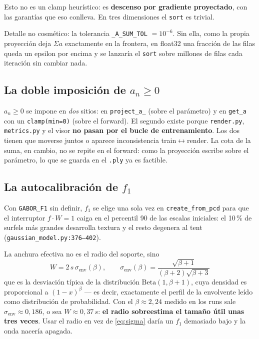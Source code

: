 \documentclass[12pt]{extarticle}
\newcommand{\ssum}{\Sigma a}
\newcommand{\code}[1]{\texttt{#1}}
\begin{document}
Esto no es un clamp heurístico: es \textbf{descenso por gradiente
proyectado}, con las garantías que eso conlleva. En tres dimensiones el
\code{sort} es trivial.

Detalle no cosmético: la tolerancia \code{\_A\_SUM\_TOL} $=10^{-6}$. Sin ella,
como la propia proyección deja $\ssum$ exactamente en la frontera, en float32
una fracción de las filas queda un epsilon por encima y se lanzaría el
\code{sort} sobre millones de filas cada iteración sin cambiar nada.

\subsection{La doble imposición de $a_n\ge0$}

$a_n\ge0$ se impone en \emph{dos} sitios: en \code{project\_a\_} (sobre el
parámetro) y en \code{get\_a} con un \code{clamp(min=0)} (sobre el forward).
El segundo existe porque \code{render.py}, \code{metrics.py} y el visor
\textbf{no pasan por el bucle de entrenamiento}. Los dos tienen que moverse
juntos o aparece inconsistencia train$\leftrightarrow$render. La cota de la
suma, en cambio, no se repite en el forward: como la proyección escribe sobre
el parámetro, lo que se guarda en el \code{.ply} ya es factible.

\subsection{La autocalibración de $f_1$}

Con \code{GABOR\_F1} sin definir, $f_1$ se elige una sola vez en
\code{create\_from\_pcd} para que el interruptor $f\!\cdot\!W=1$ caiga en el
percentil 90 de las escalas iniciales: el 10\,\% de surfels más grandes
desarrolla textura y el resto degenera al tent
(\code{gaussian\_model.py:376--402}).

La anchura efectiva no es el radio del soporte, sino
\begin{equation}
W = 2\,s\,\sigma_{\text{env}}(\beta),\qquad
\sigma_{\text{env}}(\beta)=\frac{\sqrt{\beta+1}}{(\beta+2)\sqrt{\beta+3}}
\label{eq:sigma}
\end{equation}
que es la desviación típica de la distribución $\mathrm{Beta}(1,\beta+1)$, cuya
densidad es proporcional a $(1-x)^\beta$ --- es decir, exactamente el perfil de
la envolvente leído como distribución de probabilidad. Con el $\beta\approx
2{,}24$ medido en los runs sale $\sigma_{\text{env}}\approx0{,}186$, o sea
$W\approx0{,}37\,s$: \textbf{el radio sobreestima el tamaño útil unas tres
veces}. Usar el radio en vez de \eqref{eq:sigma} daría un $f_1$ demasiado bajo
y la onda nacería apagada.
\end{document}

